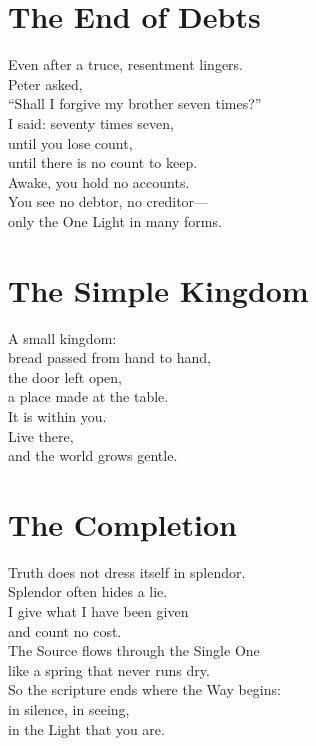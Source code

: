 \documentclass[10pt, openright]{book}
\newcommand{\sectionbreak}{\filbreak}
\newcommand{\sayingsource}[1]{\par\nopagebreak\vspace{0.3\baselineskip}{\raggedleft\footnotesize\itshape #1\par}}
\begin{document}
\sayingsource{Tao Te Ching 43, 78 · Psalm 118:22 · Thomas 66}

\sectionbreak

\section{The End of Debts}\label{the-end-of-debts}

Even after a truce, resentment lingers.\\
Peter asked,\\
``Shall I forgive my brother seven times?''\\
I said: seventy times seven,\\
until you lose count,\\
until there is no count to keep.\\
Awake, you hold no accounts.\\
You see no debtor, no creditor---\\
only the One Light in many forms.

\sayingsource{Tao Te Ching 79 · Gospel of the Hebrews · Matthew 6:12}

\sectionbreak

\section{The Simple Kingdom}\label{the-simple-kingdom}

A small kingdom:\\
bread passed from hand to hand,\\
the door left open,\\
a place made at the table.\\
It is within you.\\
Live there,\\
and the world grows gentle.

\sayingsource{Tao Te Ching 80 · Luke 17:21}

\sectionbreak

\section{The Completion}\label{the-completion}

Truth does not dress itself in splendor.\\
Splendor often hides a lie.\\
I give what I have been given\\
and count no cost.\\
The Source flows through the Single One\\
like a spring that never runs dry.\\
So the scripture ends where the Way begins:\\
in silence, in seeing,\\
in the Light that you are.
\end{document}
